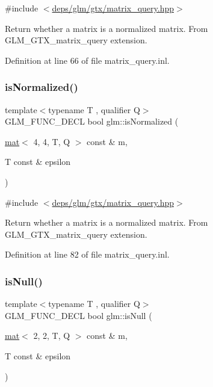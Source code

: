 {\ttfamily \#include $<$\hyperlink{matrix__query_8hpp}{deps/glm/gtx/matrix\+\_\+query.\+hpp}$>$}

Return whether a matrix is a normalized matrix. From G\+L\+M\+\_\+\+G\+T\+X\+\_\+matrix\+\_\+query extension. 

Definition at line 66 of file matrix\+\_\+query.\+inl.

\mbox{\label{group__gtx__matrix__query_ga4d9bb4d0465df49fedfad79adc6ce4ad}} 
\subsubsection{\texorpdfstring{is\+Normalized()}{isNormalized()}\hspace{0.1cm}{\footnotesize\ttfamily [3/3]}}
{\footnotesize\ttfamily template$<$typename T , qualifier Q$>$ \\
G\+L\+M\+\_\+\+F\+U\+N\+C\+\_\+\+D\+E\+CL bool glm\+::is\+Normalized (\begin{DoxyParamCaption}\item[{\hyperlink{structglm_1_1mat}{mat}$<$ 4, 4, T, Q $>$ const \&}]{m,  }\item[{T const \&}]{epsilon }\end{DoxyParamCaption})}



{\ttfamily \#include $<$\hyperlink{matrix__query_8hpp}{deps/glm/gtx/matrix\+\_\+query.\+hpp}$>$}

Return whether a matrix is a normalized matrix. From G\+L\+M\+\_\+\+G\+T\+X\+\_\+matrix\+\_\+query extension. 

Definition at line 82 of file matrix\+\_\+query.\+inl.

\mbox{\label{group__gtx__matrix__query_ga9790ec222ce948c0ff0d8ce927340dba}} 
\subsubsection{\texorpdfstring{is\+Null()}{isNull()}\hspace{0.1cm}{\footnotesize\ttfamily [1/3]}}
{\footnotesize\ttfamily template$<$typename T , qualifier Q$>$ \\
G\+L\+M\+\_\+\+F\+U\+N\+C\+\_\+\+D\+E\+CL bool glm\+::is\+Null (\begin{DoxyParamCaption}\item[{\hyperlink{structglm_1_1mat}{mat}$<$ 2, 2, T, Q $>$ const \&}]{m,  }\item[{T const \&}]{epsilon }\end{DoxyParamCaption})}



